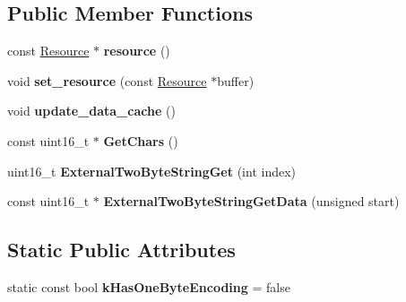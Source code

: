 \subsection*{Public Member Functions}
\begin{DoxyCompactItemize}
\item 
const \hyperlink{classv8_1_1_string_1_1_external_string_resource}{Resource} $\ast$ {\bfseries resource} ()\hypertarget{classv8_1_1internal_1_1_external_two_byte_string_ab264ae7edf3e8a176f700425292a6b51}{}\label{classv8_1_1internal_1_1_external_two_byte_string_ab264ae7edf3e8a176f700425292a6b51}

\item 
void {\bfseries set\+\_\+resource} (const \hyperlink{classv8_1_1_string_1_1_external_string_resource}{Resource} $\ast$buffer)\hypertarget{classv8_1_1internal_1_1_external_two_byte_string_a672e75f8c2877dca940d6a06ccfb7adf}{}\label{classv8_1_1internal_1_1_external_two_byte_string_a672e75f8c2877dca940d6a06ccfb7adf}

\item 
void {\bfseries update\+\_\+data\+\_\+cache} ()\hypertarget{classv8_1_1internal_1_1_external_two_byte_string_adf35077c4982dd62d5e86d3bb098a8f3}{}\label{classv8_1_1internal_1_1_external_two_byte_string_adf35077c4982dd62d5e86d3bb098a8f3}

\item 
const uint16\+\_\+t $\ast$ {\bfseries Get\+Chars} ()\hypertarget{classv8_1_1internal_1_1_external_two_byte_string_aa22bc19a94d3ee8f88e11a6e7b6302c0}{}\label{classv8_1_1internal_1_1_external_two_byte_string_aa22bc19a94d3ee8f88e11a6e7b6302c0}

\item 
uint16\+\_\+t {\bfseries External\+Two\+Byte\+String\+Get} (int index)\hypertarget{classv8_1_1internal_1_1_external_two_byte_string_a0c20e537dbe5a24ae5ef7228291c4d6c}{}\label{classv8_1_1internal_1_1_external_two_byte_string_a0c20e537dbe5a24ae5ef7228291c4d6c}

\item 
const uint16\+\_\+t $\ast$ {\bfseries External\+Two\+Byte\+String\+Get\+Data} (unsigned start)\hypertarget{classv8_1_1internal_1_1_external_two_byte_string_a2d7f982e7a525a42261b0e9696e35991}{}\label{classv8_1_1internal_1_1_external_two_byte_string_a2d7f982e7a525a42261b0e9696e35991}

\end{DoxyCompactItemize}
\subsection*{Static Public Attributes}
\begin{DoxyCompactItemize}
\item 
static const bool {\bfseries k\+Has\+One\+Byte\+Encoding} = false\hypertarget{classv8_1_1internal_1_1_external_two_byte_string_a779cfe09d1f3870f54295c173b4f9385}{}\label{classv8_1_1internal_1_1_external_two_byte_string_a779cfe09d1f3870f54295c173b4f9385}

\end{DoxyCompactItemize}
